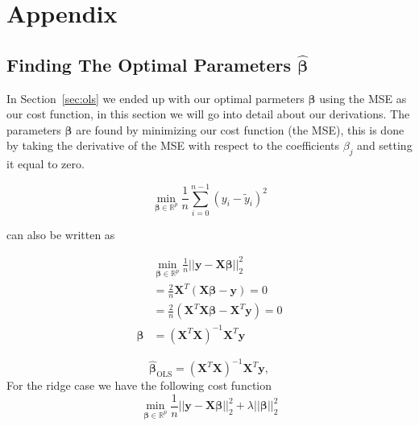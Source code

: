 \documentclass[twoside,11pt]{report}
\begin{document}




%
%
\newpage
\appendix
{}%
\section*{Appendix}
\makeatletter{}\makeatother
\label{app:appendix}




%
\subsection*{Finding The Optimal Parameters $\boldsymbol{\hat{\beta}}$}
\makeatletter{}\makeatother
\label{app:OptimalBeta}

In Section~\ref{sec:ols} we ended up with our optimal parmeters $\boldsymbol{\beta}$ using the MSE as our cost function, in this section we will go into detail about our derivations.
The parameters $\boldsymbol{\beta}$ are found by minimizing our cost function (the MSE), this is done by taking the derivative of the MSE with respect to the coefficients $\beta_j$ and setting it equal to zero.

$$
{\displaystyle \min_{\boldsymbol{\beta}\in
{\mathbb{R}}^{p}}}\frac{1}{n}\sum_{i=0}^{n-1}\left(y_i-\tilde{y}_i\right)^2
$$



can also be written as 

\begin{align*}
    &{\displaystyle \min_{\mathbf{\beta}\in
{\mathbb{R}}^{p}}}\frac{1}{n}\vert\vert \mathbf{y}-\mathbf{X}\boldsymbol{\beta}\vert\vert_2^2\\
    & = \frac{2}{n}\mathbf{X}^T\left(\mathbf{X}\boldsymbol{\beta}-\mathbf{y}\right) = 0\\
    & = \frac{2}{n}\left(\mathbf{X}^T\mathbf{X}\boldsymbol{\beta}-\mathbf{X}^T\mathbf{y}\right) = 0\\
    \boldsymbol{\beta} & = \left(\mathbf{X}^T\mathbf{X}\right)^{-1}\mathbf{X}^T\mathbf{y} 
\end{align*}

$$
\hat{\boldsymbol{\beta}}_{\mathrm{OLS}} = \left(\mathbf{X}^T\mathbf{X}\right)^{-1}\mathbf{X}^T\mathbf{y},
$$
For the ridge case we have the following cost function
$$
{\displaystyle \min_{\boldsymbol{\beta}\in
{\mathbb{R}}^{p}}}\frac{1}{n}\vert\vert \mathbf{y}-\mathbf{X}\boldsymbol{\beta}\vert\vert_2^2+\lambda\vert\vert \boldsymbol{\beta}\vert\vert_2^2
$$
\end{document}
